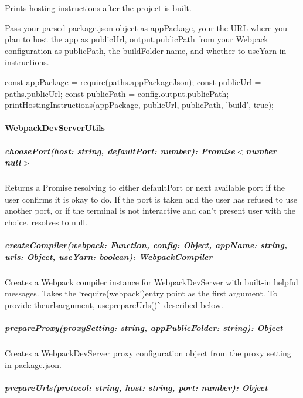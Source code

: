 Prints hosting instructions after the project is built.

Pass your parsed {\ttfamily package.\+json} object as {\ttfamily app\+Package}, your the \mbox{\hyperlink{namespace_u_r_l}{U\+RL}} where you plan to host the app as {\ttfamily public\+Url}, {\ttfamily output.\+public\+Path} from your Webpack configuration as {\ttfamily public\+Path}, the {\ttfamily build\+Folder} name, and whether to {\ttfamily use\+Yarn} in instructions.


\begin{DoxyCode}
const appPackage = require(paths.appPackageJson);
const publicUrl = paths.publicUrl;
const publicPath = config.output.publicPath;
printHostingInstructions(appPackage, publicUrl, publicPath, 'build', true);
\end{DoxyCode}


\paragraph*{{\ttfamily Webpack\+Dev\+Server\+Utils}}

\subparagraph*{{\ttfamily choose\+Port(host\+: string, default\+Port\+: number)\+: Promise$<$number $\vert$ null$>$}}

Returns a Promise resolving to either {\ttfamily default\+Port} or next available port if the user confirms it is okay to do. If the port is taken and the user has refused to use another port, or if the terminal is not interactive and can’t present user with the choice, resolves to {\ttfamily null}.

\subparagraph*{{\ttfamily create\+Compiler(webpack\+: Function, config\+: Object, app\+Name\+: string, urls\+: Object, use\+Yarn\+: boolean)\+: Webpack\+Compiler}}

Creates a Webpack compiler instance for Webpack\+Dev\+Server with built-\/in helpful messages. Takes the `require(\textquotesingle{}webpack'){\ttfamily entry point as the first argument. To provide the}urls{\ttfamily argument, use}prepare\+Urls()\`{} described below.

\subparagraph*{{\ttfamily prepare\+Proxy(proxy\+Setting\+: string, app\+Public\+Folder\+: string)\+: Object}}

Creates a Webpack\+Dev\+Server {\ttfamily proxy} configuration object from the {\ttfamily proxy} setting in {\ttfamily package.\+json}.

\subparagraph*{{\ttfamily prepare\+Urls(protocol\+: string, host\+: string, port\+: number)\+: Object}}

